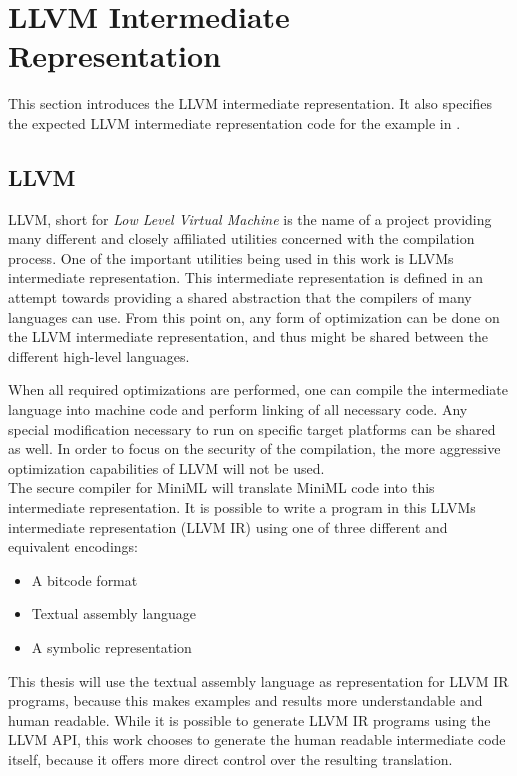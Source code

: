
\section{LLVM Intermediate Representation}
\label{sec:LLVM}
This section introduces the LLVM intermediate representation.
It also specifies the expected LLVM intermediate representation code for the example in .

\subsection{LLVM}
LLVM, short for \emph{Low Level Virtual Machine} is the name of a project providing many different and closely affiliated utilities concerned with the compilation process.
One of the important utilities being used in this work is LLVMs intermediate representation.
This intermediate representation is defined in an attempt towards providing a shared abstraction that the compilers of many languages can use.
From this point on, any form of optimization can be done on the LLVM intermediate representation, and thus might be shared between the different high-level languages.

When all required optimizations are performed, one can compile the intermediate language into machine code and perform linking of all necessary code.
Any special modification necessary to run on specific target platforms can be shared as well.
In order to focus on the security of the compilation, the more aggressive optimization capabilities of LLVM will not be used.
\\[1em]
The secure compiler for \mbox{MiniML} will translate \mbox{MiniML} code into this intermediate representation.
It is possible to write a program in this LLVMs intermediate representation (LLVM IR) using one of three different and equivalent encodings:
\begin{itemize}
\item A bitcode format
\item Textual assembly language
\item A symbolic representation
\end{itemize}

This thesis will use the textual assembly language as representation for LLVM IR programs, because this makes examples and results more understandable and human readable.
While it is possible to generate LLVM IR programs using the LLVM API, this work chooses to generate the human readable intermediate code itself, because it offers more direct control over the resulting translation.

